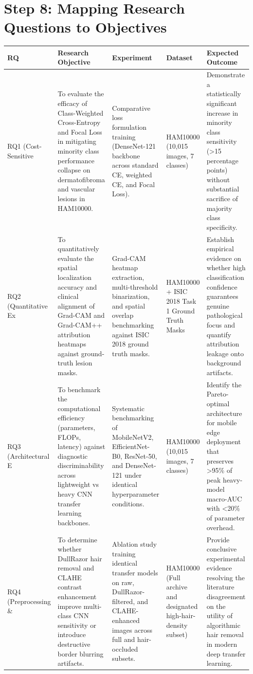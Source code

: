 \documentclass[11pt,a4paper]{article}
\begin{document}
\section{Step 8: Mapping Research Questions to Objectives}
\begin{table}[htbp]
\centering
\footnotesize
\begin{tabularx}{\textwidth}{p{2.0cm} p{3.5cm} p{3.5cm} p{2.0cm} p{3.0cm}}
\toprule
\textbf{RQ} & \textbf{Research Objective} & \textbf{Experiment} & \textbf{Dataset} & \textbf{Expected Outcome} \\
\midrule
RQ1 (Cost-Sensitive  & To evaluate the efficacy of Class-Weighted Cross-Entropy and Focal Loss in mitigating minority class performance collapse on dermatofibroma and vascular lesions in HAM10000. & Comparative loss formulation training (DenseNet-121 backbone across standard CE, weighted CE, and Focal Loss). & HAM10000 (10,015 images, 7 classes) & Demonstrate a statistically significant increase in minority class sensitivity (>15 percentage points) without substantial sacrifice of majority class specificity. \\
\midrule
RQ2 (Quantitative Ex & To quantitatively evaluate the spatial localization accuracy and clinical alignment of Grad-CAM and Grad-CAM++ attribution heatmaps against ground-truth lesion masks. & Grad-CAM heatmap extraction, multi-threshold binarization, and spatial overlap benchmarking against ISIC 2018 ground truth masks. & HAM10000 + ISIC 2018 Task 1 Ground Truth Masks & Establish empirical evidence on whether high classification confidence guarantees genuine pathological focus and quantify attribution leakage onto background artifacts. \\
\midrule
RQ3 (Architectural E & To benchmark the computational efficiency (parameters, FLOPs, latency) against diagnostic discriminability across lightweight vs heavy CNN transfer learning backbones. & Systematic benchmarking of MobileNetV2, EfficientNet-B0, ResNet-50, and DenseNet-121 under identical hyperparameter conditions. & HAM10000 (10,015 images, 7 classes) & Identify the Pareto-optimal architecture for mobile edge deployment that preserves >95\% of peak heavy-model macro-AUC with <20\% of parameter overhead. \\
\midrule
RQ4 (Preprocessing \& & To determine whether DullRazor hair removal and CLAHE contrast enhancement improve multi-class CNN sensitivity or introduce destructive border blurring artifacts. & Ablation study training identical transfer models on raw, DullRazor-filtered, and CLAHE-enhanced images across full and hair-occluded subsets. & HAM10000 (Full archive and designated high-hair-density subset) & Provide conclusive experimental evidence resolving the literature disagreement on the utility of algorithmic hair removal in modern deep transfer learning. \\

\end{tabularx}
\end{table}
\end{document}
